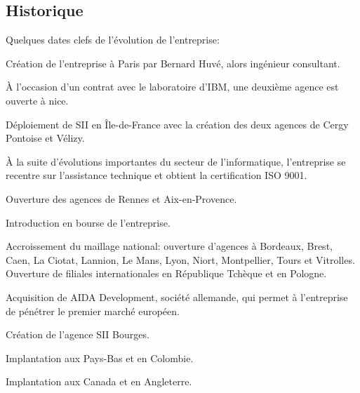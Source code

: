 {{{			%
		}
		\subsection{Historique}
			
			\par
			{
				Quelques dates clefs de l'évolution de l'entreprise:
			}
			
			\begin{description}
			{
				\item[1979:] Création de l'entreprise à Paris par Bernard Huvé, alors ingénieur consultant.
				\item[1984:] À l'occasion d'un contrat avec le laboratoire d'IBM, une deuxième agence est ouverte à nice.
				\item[1987-1989:] Déploiement de SII en Île-de-France avec la création des deux agences de Cergy Pontoise et Vélizy.
				\item[1992:] À la suite d'évolutions importantes du secteur de l'informatique, l'entreprise se recentre sur l'assistance technique et obtient la certification ISO 9001.
				\item[1997:] Ouverture des agences de Rennes et Aix-en-Provence.
				\item[1999:] Introduction en bourse de l'entreprise.
				\item[2000-2007:] Accroissement du maillage national: ouverture d'agences à Bordeaux, Brest, Caen, La Ciotat, Lannion, Le Mans, Lyon, Niort, Montpellier, Tours et Vitrolles. Ouverture de filiales internationales en République Tchèque et en Pologne.
				\item[2010:] Acquisition de AIDA Development, société allemande, qui permet à l'entreprise de pénétrer le premier marché européen.
				\item[Août 2010:] Création de l'agence SII Bourges.
				\item[2015:] Implantation aux Pays-Bas et en Colombie.
				\item[2016:] Implantation aux Canada et en Angleterre.
			}
			\end{description}
	}
}
